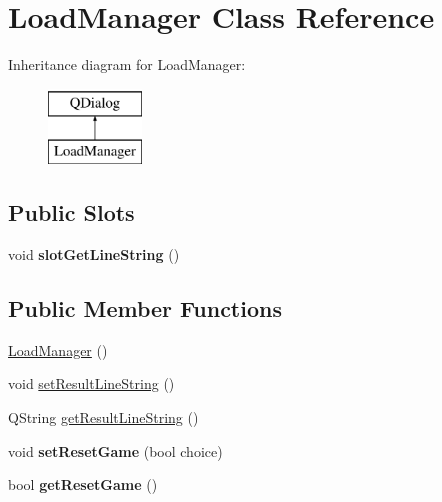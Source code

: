 \hypertarget{class_load_manager}{\section{Load\-Manager Class Reference}
\label{class_load_manager}
}
Inheritance diagram for Load\-Manager\-:\begin{figure}[H]
\begin{center}
\leavevmode
\includegraphics[height=2.000000cm]{class_load_manager}
\end{center}
\end{figure}
\subsection*{Public Slots}
\begin{DoxyCompactItemize}
\item 
\hypertarget{class_load_manager_a73a76f559fb3eae3fc16d65b34276e0a}{void {\bfseries slot\-Get\-Line\-String} ()}\label{class_load_manager_a73a76f559fb3eae3fc16d65b34276e0a}

\end{DoxyCompactItemize}
\subsection*{Public Member Functions}
\begin{DoxyCompactItemize}
\item 
\hyperlink{class_load_manager_a2914615829aea71d78804bae8d5013ce}{Load\-Manager} ()
\item 
void \hyperlink{class_load_manager_a30a72c8effff889e4c32142f51073063}{set\-Result\-Line\-String} ()
\item 
Q\-String \hyperlink{class_load_manager_a624cd9651a0cc70556e2e69f481d353b}{get\-Result\-Line\-String} ()
\item 
\hypertarget{class_load_manager_af4cb310a74fe34e284f49736fd1c73ab}{void {\bfseries set\-Reset\-Game} (bool choice)}\label{class_load_manager_af4cb310a74fe34e284f49736fd1c73ab}

\item 
\hypertarget{class_load_manager_a8db4858927177fcb045613abbeb47831}{bool {\bfseries get\-Reset\-Game} ()}\label{class_load_manager_a8db4858927177fcb045613abbeb47831}

\end{DoxyCompactItemize}
